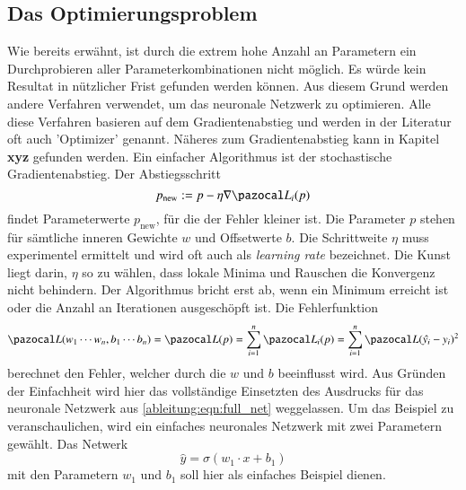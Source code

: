 \subsection{Das Optimierungsproblem}
Wie bereits erwähnt, ist durch die extrem hohe Anzahl an Parametern ein Durchprobieren aller Parameterkombinationen nicht möglich.
Es würde kein Resultat in nützlicher Frist gefunden werden können.
Aus diesem Grund werden andere Verfahren verwendet, um das neuronale Netzwerk zu optimieren.
Alle diese Verfahren basieren auf dem Gradientenabstieg und werden in der Literatur oft auch 'Optimizer' genannt. Näheres zum Gradientenabstieg kann in Kapitel \textbf{xyz} gefunden werden.
Ein einfacher Algorithmus ist der stochastische Gradientenabstieg.
Der Abstiegsschritt 
\begin{equation}
p_{\text{new}}:=p-\eta \nabla \Lb_{i}(p)
\end{equation}
findet Parameterwerte $p_{\text{new}}$, für die der Fehler kleiner ist. Die Parameter $p$ stehen für sämtliche inneren Gewichte $w$ und Offsetwerte $b$. Die Schrittweite $\eta$ muss experimentel ermittelt und wird oft auch als \textit{learning rate} bezeichnet. Die Kunst liegt darin, $\eta$ so zu wählen, dass lokale Minima und Rauschen die Konvergenz nicht behindern. Der Algorithmus bricht erst ab, wenn ein Minimum erreicht ist oder die Anzahl an Iterationen ausgeschöpft ist.
Die Fehlerfunktion
\begin{equation}
\Lb(w_1 \cdots w_n, b_1 \cdots b_n) = \Lb(p)=\sum_{i=1}^{n}\Lb_{i}(p)=\sum_{i=1}^{n}\Lb(\hat{y_i}-y_i)^2
\end{equation}
berechnet den Fehler, welcher durch die $w$ und $b$ beeinflusst wird. Aus Gründen der Einfachheit wird hier das vollständige Einsetzten des Ausdrucks für das neuronale Netzwerk aus \eqref{ableitung:eqn:full_net} weggelassen.
Um das Beispiel zu veranschaulichen, wird ein einfaches neuronales Netzwerk mit zwei Parametern  gewählt. Das Netwerk
\begin{equation}
	\hat{y} = \sigma \left( w_1 \cdot x + b_1 \right)
\end{equation}
mit den Parametern $w_1$ und $b_1$ soll hier als einfaches Beispiel dienen.

